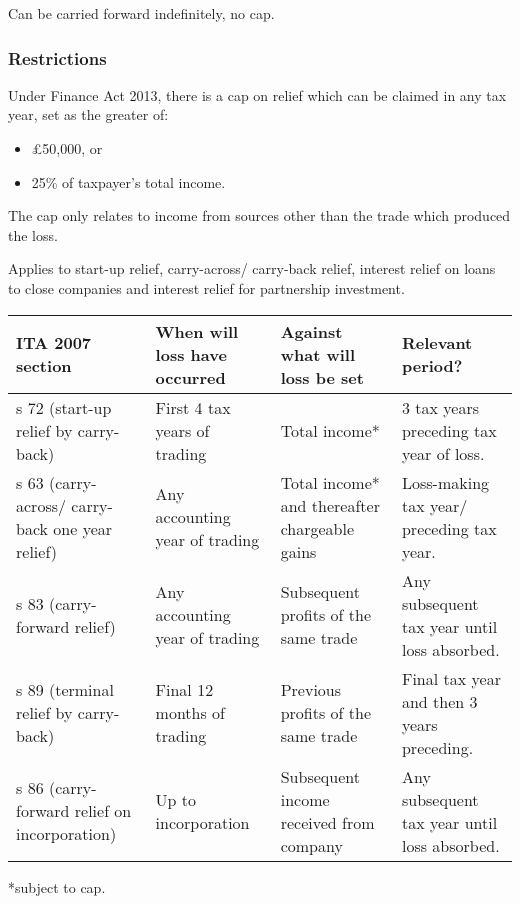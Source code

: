 \documentclass[
]{article}
\providecommand{\tightlist}{%
  \setlength{\itemsep}{0pt}\setlength{\parskip}{0pt}}
\begin{document}
Can be carried forward indefinitely, no cap.

\hypertarget{restrictions}{%
\subsubsection{Restrictions}\label{restrictions}}

Under Finance Act 2013, there is a cap on relief which can be claimed in
any tax year, set as the greater of:

\begin{itemize}
\tightlist
\item
  £50,000, or
\item
  25\% of taxpayer's total income.
\end{itemize}

The cap only relates to income from sources other than the trade which
produced the loss.

Applies to start-up relief, carry-across/ carry-back relief, interest
relief on loans to close companies and interest relief for partnership
investment.

\begin{longtable}[]{@{}llll@{}}
\toprule()
ITA 2007 section & When will loss have occurred & Against what will loss
be set & Relevant period? \\
\midrule()
\endhead
s 72 (start-up relief by carry-back) & First 4 tax years of trading &
Total income* & 3 tax years preceding tax year of loss. \\
s 63 (carry-across/ carry-back one year relief) & Any accounting year of
trading & Total income* and thereafter chargeable gains & Loss-making
tax year/ preceding tax year. \\
s 83 (carry-forward relief) & Any accounting year of trading &
Subsequent profits of the same trade & Any subsequent tax year until
loss absorbed. \\
s 89 (terminal relief by carry-back) & Final 12 months of trading &
Previous profits of the same trade & Final tax year and then 3 years
preceding. \\
s 86 (carry-forward relief on incorporation) & Up to incorporation &
Subsequent income received from company & Any subsequent tax year until
loss absorbed. \\
\bottomrule()
\end{longtable}

*subject to cap.
\end{document}
